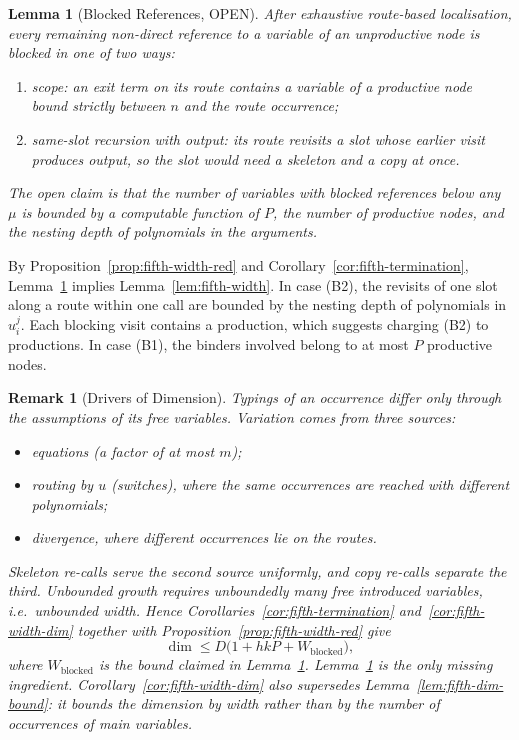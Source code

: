 \documentclass[10pt,a4paper]{article}
\theoremstyle{plain}%
\newtheorem{lemma}[theorem]{Lemma}
\newtheorem{remark}[theorem]{Remark}
\begin{document}
\begin{lemma}[Blocked References, OPEN]\label{lem:fifth-blocked}
After exhaustive route-based localisation, every remaining non-direct reference to a variable of an unproductive node is blocked in one of two ways:
\begin{enumerate}
\item[(B1)] \emph{scope}: an exit term on its route contains a variable of a productive node bound strictly between $n$ and the route occurrence;
\item[(B2)] \emph{same-slot recursion with output}: its route revisits a slot whose earlier visit produces output, so the slot would need a skeleton and a copy at once.
\end{enumerate}
The open claim is that the number of variables with blocked references below any $\mu$ is bounded by a computable function of $P$, the number of productive nodes, and the nesting depth of polynomials in the arguments.
\end{lemma}

By Proposition~\ref{prop:fifth-width-red} and Corollary~\ref{cor:fifth-termination}, Lemma~\ref{lem:fifth-blocked} implies Lemma~\ref{lem:fifth-width}.
In case (B2), the revisits of one slot along a route within one call are bounded by the nesting depth of polynomials in $u_i^j$.
Each blocking visit contains a production, which suggests charging (B2) to productions.
In case (B1), the binders involved belong to at most $P$ productive nodes.


\begin{remark}[Drivers of Dimension]
Typings of an occurrence differ only through the assumptions of its free variables.
Variation comes from three sources:
\begin{itemize}
\item equations (a factor of at most $m$);
\item routing by $u$ (switches), where the same occurrences are reached with different polynomials;
\item divergence, where different occurrences lie on the routes.
\end{itemize}
Skeleton re-calls serve the second source uniformly, and copy re-calls separate the third.
Unbounded growth requires unboundedly many free introduced variables, i.e.\ unbounded width.
Hence Corollaries~\ref{cor:fifth-termination} and~\ref{cor:fifth-width-dim} together with Proposition~\ref{prop:fifth-width-red} give
\[
\dim \le D\bigl(1 + hkP + W_{\mathrm{blocked}}\bigr),
\]
where $W_{\mathrm{blocked}}$ is the bound claimed in Lemma~\ref{lem:fifth-blocked}.
Lemma~\ref{lem:fifth-blocked} is the only missing ingredient.
Corollary~\ref{cor:fifth-width-dim} also supersedes Lemma~\ref{lem:fifth-dim-bound}: it bounds the dimension by width rather than by the number of occurrences of main variables.
\end{remark}
\end{document}
